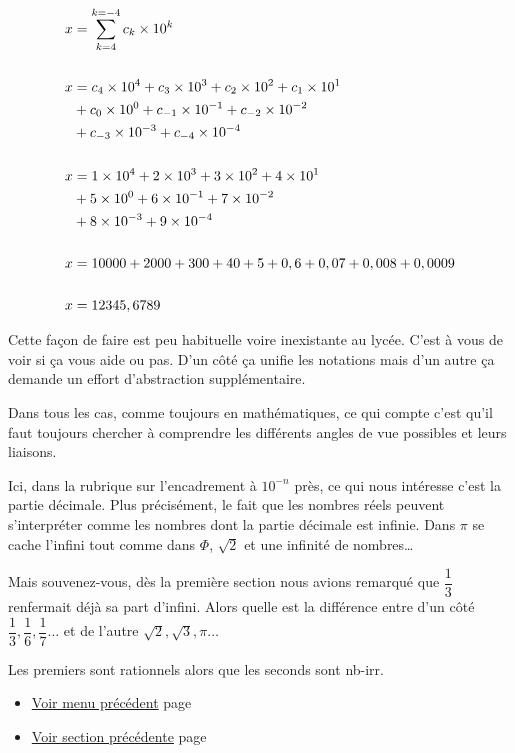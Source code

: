 \documentclass[a4paper,11pt]{book}
\begin{document}
\begin{align*}
x &= \sum_{k = 4}^{k = -4}c_k\times 10^k\\ \\
x &= c_4\times 10^4 + c_3\times 10^3 + c_2\times 10^2 + c_1\times 10^1\notag \\
  &+ c_0\times 10^0 + c_{-1}\times 10^{-1} + c_{-2}\times
  10^{-2}\notag \\
  &+ c_{-3}\times 10^{-3} + c_{-4}\times 10^{-4}\\ \\
x &= 1\times 10^4 + 2\times 10^3 + 3\times 10^2 + 4\times 10^1\notag
\\
  &+ 5\times 10^0 + 6\times 10^{-1} + 7\times 10^{-2}\notag \\
  &+ 8\times 10^{-3} + 9\times 10^{-4}\\ \\
x &= 10 000 + 2 000 + 300 + 40 + 5 + 0,6 + 0,07 + 0,008 + 0,0009\\ \\
x &= 12345,6789
\end{align*}

\newpage

Cette façon de faire est peu habituelle voire inexistante au
lycée. C'est à vous de voir si ça vous aide ou pas. D'un côté ça
unifie les notations mais d'un autre ça demande un effort
d'abstraction supplémentaire.

Dans tous les cas, comme toujours en mathématiques, ce qui compte
c'est qu'il faut toujours chercher à comprendre les différents
angles de vue possibles et leurs liaisons.

Ici, dans la rubrique sur l'encadrement à \(10^{-n}\) près, ce qui
nous intéresse c'est la partie décimale. Plus précisément, le fait
que les nombres réels peuvent s'interpréter comme les nombres dont
la partie décimale est infinie. Dans \(\pi\) se cache l'infini tout
comme dans \(\Phi\), \(\sqrt{2}\) et une infinité de nombres\ldots{}

Mais souvenez-vous, dès la première section nous avions remarqué
que \(\dfrac{1}{3}\) renfermait déjà sa part d'infini. Alors quelle
est la différence entre d'un côté \(\dfrac{1}{3}, \dfrac{1}{6},
    \dfrac{1}{7}\dots\) et de l'autre \(\sqrt{2}, \sqrt{3}, \pi\dots\)

Les premiers sont rationnels alors que les
seconds sont \gls{nb-irr}.


\begin{itemize}
\item \hyperref[orgdd2209a]{Voir menu précédent}
page~\pageref{page:content5-menu}
\item \hyperref[org3125f8c]{Voir section précédente}
page~\pageref{page:sec2.5.2exo9}
\end{itemize}
\end{document}
